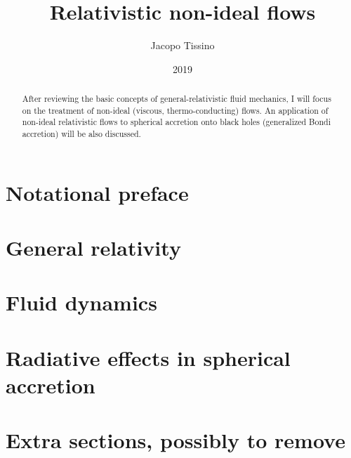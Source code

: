 \documentclass[a4paper, 11pt]{article}
\title{Relativistic non-ideal flows}
\author{Jacopo Tissino}
\date{2019}
\begin{document}


\begin{abstract}
After reviewing the basic concepts of general-relativistic fluid mechanics, I will focus on the treatment of non-ideal
(viscous, thermo-conducting) flows. An application of non-ideal relativistic flows to spherical accretion onto black holes
(generalized Bondi accretion) will be also discussed.
\end{abstract}

\setcounter{tocdepth}{4}
\tableofcontents

\section{Notational preface} \label{sec:notational-preface}


\section{General relativity} \label{sec:general-relativity}


\section{Fluid dynamics} \label{sec:fluid-dynamics}


\section{Radiative effects in spherical accretion} \label{sec:radiative-effects}


\section{Extra sections, possibly to remove} \label{sec:formulas} 


\printbibliography[title={Bibliography}]

\end{document}
